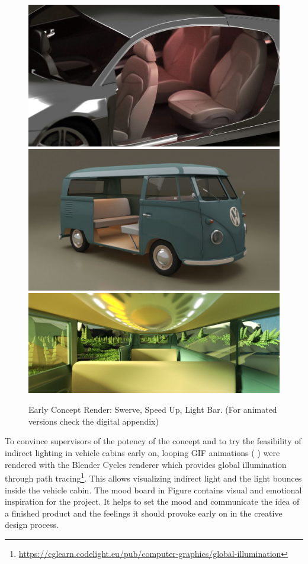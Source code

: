 \begin{figure}
    \includegraphics[height=0.28\textwidth]{fig/swerve_Mittel.jpg}\hfill\includegraphics[height=0.28\textwidth]{fig/busLight_Mittel.jpg}\newline\includegraphics[width=1\textwidth]{fig/0013GRADIENTcut.jpg}
    \caption[Early Concept Render]{Early Concept Render: Swerve, Speed Up, Light Bar. (For animated versions check the digital appendix)}
    \label{fig:conceptrender}
\end{figure}

To convince supervisors of the potency of the concept and to try the feasibility of indirect lighting in vehicle cabins early on, looping GIF animations ( ) were rendered with the Blender Cycles renderer which provides global illumination through path tracing\footnote{\url{https://cglearn.codelight.eu/pub/computer-graphics/global-illumination}}. This allows visualizing indirect light and the light bounces inside the vehicle cabin. The mood board in Figure  contains visual and emotional inspiration for the project. It helps to set the mood and communicate the idea of a finished product and the feelings it should provoke early on in the creative design process\cite{Cassidy2011TheTool}. 

